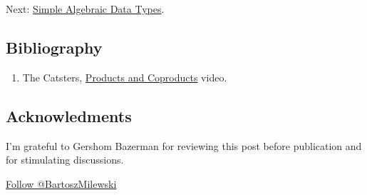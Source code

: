 Next:
\href{https://bartoszmilewski.com/2015/01/13/simple-algebraic-data-types/}{Simple
Algebraic Data Types}.

\subsection{Bibliography}\label{bibliography}

\begin{enumerate}
\tightlist
\item
  The Catsters,
  \href{https://www.youtube.com/watch?v=upCSDIO9pjc}{Products and
  Coproducts} video.
\end{enumerate}

\subsection{Acknowledments}\label{acknowledments}

I'm grateful to Gershom Bazerman for reviewing this post before
publication and for stimulating discussions.

\href{https://twitter.com/BartoszMilewski}{Follow @BartoszMilewski}
